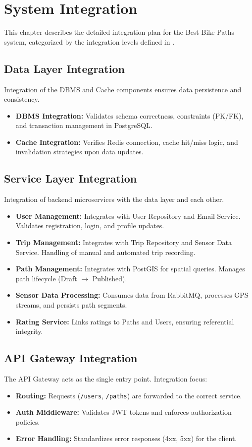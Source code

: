 \section{System Integration}
\label{sec:system_integration}

This chapter describes the detailed integration plan for the Best Bike Paths system, categorized by the integration levels defined in .

\subsection{Data Layer Integration}
Integration of the DBMS and Cache components ensures data persistence and consistency.
\begin{itemize}
    \item \textbf{DBMS Integration:} Validates schema correctness, constraints (PK/FK), and transaction management in PostgreSQL.
    \item \textbf{Cache Integration:} Verifies Redis connection, cache hit/miss logic, and invalidation strategies upon data updates.
\end{itemize}

\subsection{Service Layer Integration}
Integration of backend microservices with the data layer and each other.
\begin{itemize}
    \item \textbf{User Management:} Integrates with User Repository and Email Service. Validates registration, login, and profile updates.
    \item \textbf{Trip Management:} Integrates with Trip Repository and Sensor Data Service. Handling of manual and automated trip recording.
    \item \textbf{Path Management:} Integrates with PostGIS for spatial queries. Manages path lifecycle (Draft $\to$ Published).
    \item \textbf{Sensor Data Processing:} Consumes data from RabbitMQ, processes GPS streams, and persists path segments.
    \item \textbf{Rating Service:} Links ratings to Paths and Users, ensuring referential integrity.
\end{itemize}

\subsection{API Gateway Integration}
The API Gateway acts as the single entry point. Integration focus:
\begin{itemize}
    \item \textbf{Routing:} Requests (\texttt{/users}, \texttt{/paths}) are forwarded to the correct service.
    \item \textbf{Auth Middleware:} Validates JWT tokens and enforces authorization policies.
    \item \textbf{Error Handling:} Standardizes error responses (4xx, 5xx) for the client.
\end{itemize}

